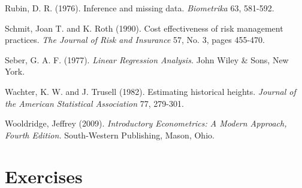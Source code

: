 \begin{multicols}{2}
Rubin, D. R. (1976). Inference and missing data. \textit{Biometrika}
63, 581-592.

Schmit, Joan T. and K. Roth (1990). Cost effectiveness of risk
management practices. \textit{The Journal of Risk and Insurance} 57,
No. 3, pages 455-470.

Seber, G. A. F. (1977). \textit{Linear Regression Analysis.} John
Wiley \& Sons, New York.

Wachter, K. W.  and J. Trusell (1982). Estimating historical
heights. \textit{Journal of the American Statistical Association}
77, 279-301.

Wooldridge, Jeffrey (2009). \textit{Introductory Econometrics: A
Modern Approach, Fourth Edition.} South-Western Publishing, Mason,
Ohio.


\end{multicols}

\section{Exercises}


